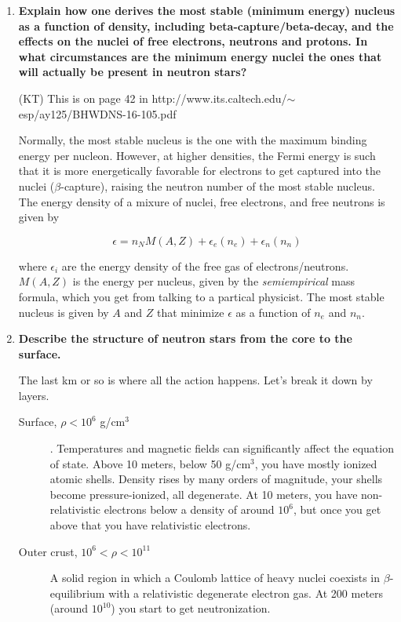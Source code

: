 \documentclass[a4paper]{article}
\newcommand{\gcm}{g/$\mathrm{cm}^3$}
\begin{document}
\begin{enumerate}
\item \textbf{Explain how one derives the most stable (minimum energy) nucleus as a function of density, including beta-capture/beta-decay, and the effects on the nuclei of free electrons, neutrons
and protons. In what circumstances are the minimum energy nuclei the ones that will actually be present in neutron stars?}

(KT) This is on page 42 in http://www.its.caltech.edu/$\sim$esp/ay125/BHWDNS-16-105.pdf

Normally, the most stable nucleus is the one with the maximum binding energy per nucleon. However, at higher densities, the Fermi energy is such that it is more energetically favorable for electrons to get captured into the nuclei ($\beta$-capture), raising the neutron number of the most stable nucleus. The energy density of a mixure of nuclei, free electrons, and free neutrons is given by 

$$ \epsilon = n_N M(A,Z) + \epsilon_e(n_e) + \epsilon_n(n_n) $$

where $\epsilon_i$ are the energy density of the free gas of electrons/neutrons. $M(A,Z)$ is the energy per nucleus, given by the \textit{semiempirical} mass formula, which you get from talking to a partical physicist. The most stable nucleus is given by $A$ and $Z$ that minimize $\epsilon$ as a function of $n_e$ and $n_n$. 

\item \textbf{Describe the structure of neutron stars from the core to the surface.}

The last km or so is where all the action happens. Let's break it down by layers.

\begin{description}

\item[Surface, $\rho < 10^6$ \gcm]. Temperatures and magnetic fields can significantly affect the equation of state. Above 10 meters, below 50 \gcm, you have mostly ionized atomic shells. Density rises by many orders of magnitude, your shells become pressure-ionized, all degenerate. At 10 meters, you have non-relativistic electrons below a density of around $10^6$, but once you get above that you have relativistic electrons.

\item[Outer crust, $10^6 < \rho < 10^{11}$] A solid region in which a Coulomb lattice of heavy nuclei coexists in $\beta$-equilibrium with a relativistic degenerate electron gas. At 200 meters (around $10^{10}$) you start to get neutronization. 


\end{description}
\end{enumerate}
\end{document}
